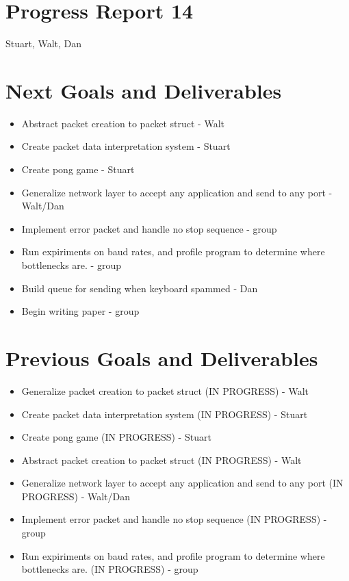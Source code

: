 \documentclass{article}
\begin{document}
\section*{Progress Report 14}
Stuart, Walt, Dan

\section*{Next Goals and Deliverables}
\begin{itemize}
    \item Abstract packet creation to packet struct - Walt
    \item Create packet data interpretation system - Stuart
    \item Create pong game - Stuart
    \item Generalize network layer to accept any application and send to any port - Walt/Dan
    \item Implement error packet and handle no stop sequence - group
    \item Run expiriments on baud rates, and profile program to determine where bottlenecks are. - group
    \item Build queue for sending when keyboard spammed - Dan
    \item Begin writing paper - group
\end{itemize}

\section*{Previous Goals and Deliverables}
\begin{itemize}
    \item Generalize packet creation to packet struct (IN PROGRESS) - Walt
    \item Create packet data interpretation system (IN PROGRESS) - Stuart
    \item Create pong game (IN PROGRESS) - Stuart
    \item Abstract packet creation to packet struct (IN PROGRESS) - Walt
    \item Generalize network layer to accept any application and send to any port (IN PROGRESS) - Walt/Dan
    \item Implement error packet and handle no stop sequence (IN PROGRESS) - group
    \item Run expiriments on baud rates, and profile program to determine where bottlenecks are. (IN PROGRESS) - group
\end{itemize}
\end{document}
